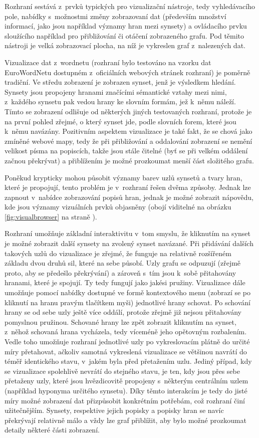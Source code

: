 \documentclass[a4paper,11pt,openany,twoside]{book}
\begin{document}
					Rozhraní sestává z~prvků typických pro vizualizační nástroje, tedy vyhledávacího pole, nabídky s~možnostmi změny zobrazovaní dat (především množství informací, jako jsou například významy hran mezi synsety) a ovládacího prvku sloužícího například pro přibližování či otáčení zobrazeného grafu. Pod těmito nástroji je velká zobrazovací plocha, na níž je vykreslen graf z~nalezených dat. 

					Vizualizace dat z~wordnetu (rozhraní bylo testováno na vzorku dat EuroWordNetu dostupném z~oficiálních webových stránek rozhraní) je poměrně tradiční. Ve středu zobrazení je zobrazen synset, jenž je výsledkem hledání. Synsety jsou propojeny hranami značícími sémantické vztahy mezi nimi, z~každého synsetu pak vedou hrany ke slovním formám, jež k~němu náleží. Tímto se zobrazení odlišuje od některých jiných testovaných rozhraní, protože je na první pohled zřejmé, o který synset jde, podle slovních forem, které jsou k~němu navázány. Pozitivním aspektem vizualizace je také fakt, že se chová jako zmíněné webové mapy, tedy že při přibližování a oddalování zobrazení se nemění velikost písma na popiscích, takže jsou stále čitelné (byť se při velkém oddálení začnou překrývat) a přiblížením je možné prozkoumat menší část složitého grafu. 

					Poněkud krypticky mohou působit významy barev uzlů synsetů a tvary hran, které je propojují, tento problém je v~rozhraní řešen dvěma způsoby. Jednak lze zapnout v~nabídce zobrazování popisů hran, jednak je možné zobrazit nápovědu, kde jsou významy vizuálních prvků objasněny (obojí viditelné na obrázku \ref{fig:visualbrowser} na straně \pageref{fig:visualbrowser}). 

					Rozhraní umožňuje základní interaktivitu v~tom smyslu, že kliknutím na synset je možné zobrazit další synsety na zvolený synset navázané. Při přidávání dalších takových uzlů do vizualizace je zřejmé, že funguje na relativně rozšířeném základu dvou druhů sil, které na sebe působí. Uzly grafu se odpuzují (zřejmě proto, aby se předešlo překrývání) a zároveň s~tím jsou k~sobě přitahovány hranami, které je spojují. Ty tedy fungují jako jakési pružiny. Vizualizace dále umožňuje pomocí nabídky dostupné ve formě kontextového menu (zobrazí se po kliknutí na hranu pravým tlačítkem myši) jednotlivé hrany schovat. Po schování hrany se od sebe uzly ještě více oddálí, protože zřejmě již nejsou přitahovány pomyslnou pružinou. Schované hrany lze zpět zobrazit kliknutím na synset, z~něhož schovaná hrana vycházela, tedy víceméně jeho opětovným rozbalením. Vedle toho umožňuje rozhraní jednotlivé uzly po vykreslovacím plátně do určité míry přetahovat, ačkoliv samotná vykreslená vizualizace se většinou navrátí do téměř identického stavu, v~jakém byla před přetažením uzlu. Jediný případ, kdy se vizualizace spolehlivě nevrátí do stejného stavu, je ten, kdy jsou přes sebe přetaženy uzly, které jsou hvězdicovitě propojeny s~některým centrálním uzlem (například hyponyma určitého synsetu). Díky těmto interakcím je tedy do jisté míry možné zobrazení dat přizpůsobit konkrétním potřebám, což rozhraní činí užitečnějším. Synsety, respektive jejich popisky a popisky hran se navíc překrývají relativně málo a vždy lze graf přiblížit, aby bylo možné prozkoumat detaily některé části zobrazení.
\end{document}
